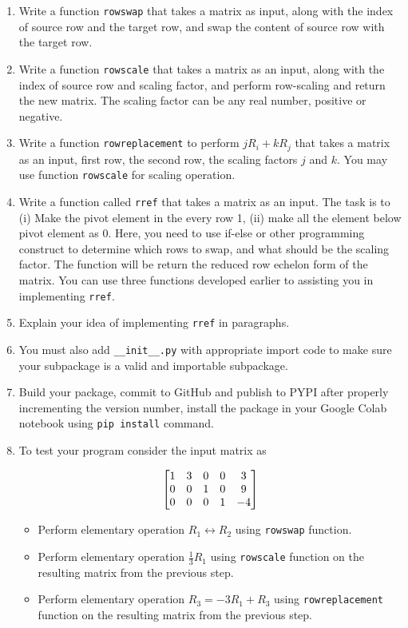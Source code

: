 \documentclass[12pt, xcolor=dvipsnames,svgnames,x11names]{article}
\makeatletter
\newenvironment{multiequation}[1][]{%
\begin{equation}%
   \begin{aligned}%
   \ifx#1\@empty\else\label{#1}\fi%
}{%
   \end{aligned}%
\end{equation}%
}
\makeatother
\begin{document}
\begin{enumerate}
   \item Write a function \texttt{rowswap} that takes a matrix as input, along with the index of source row and the target row, and swap the content of source row with the target row.
   \item Write a function \texttt{rowscale} that takes a matrix as an input, along with the index of source row and scaling factor, and perform row-scaling and return the new matrix. The scaling factor can be any real number, positive or negative.
   \item Write a function \texttt{rowreplacement} to perform $jR_i + kR_j$ that takes a matrix as an input, first row, the second row, the scaling factors $j$ and $k$. You may use function \texttt{rowscale} for scaling operation.
   \item Write a function called \texttt{rref} that takes a matrix as an input. The task is to (i) Make the pivot element in the every row 1, (ii) make all the element below pivot element as 0. Here, you need to use if-else or other programming construct to determine which rows to swap, and what should be the scaling factor. The function will be return the reduced row echelon form of the matrix. You can use three functions developed earlier to assisting you in implementing \texttt{rref}.
   \item Explain your idea of implementing \texttt{rref} in paragraphs.
   \item You must also add \texttt{\_\_init\_\_.py} with appropriate import code to make sure your subpackage is a valid and importable subpackage.
   \item Build your package, commit to GitHub and publish to PYPI after properly incrementing the version number, install the package in your Google Colab notebook using \texttt{pip install} command.
   \item To test your program consider the input matrix as 
   
   \begin{multiequation}
      \begin{bmatrix}
      1 & 3 & 0 & 0 & 3\\
      0 & 0 & 1 & 0 & 9\\
      0 & 0 & 0 & 1 & -4
   \end{bmatrix}
   \end{multiequation}

   \begin{itemize}
      \item Perform elementary operation $R_1 \leftrightarrow  R_2$  using \texttt{rowswap} function.
      \item Perform elementary operation $\frac{1}{3}R_1$  using \texttt{rowscale} function on the resulting matrix from the previous step.
      \item Perform elementary operation $R_3 = -3R_1 + R_3$  using \texttt{rowreplacement} function on the resulting matrix from the previous step.
   \end{itemize}
\end{enumerate}
\end{document}

